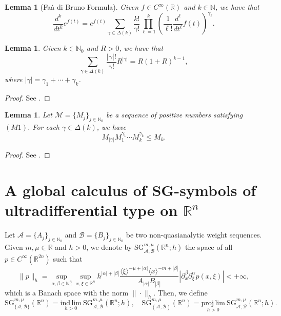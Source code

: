 \documentclass[11pt,reqno]{amsart}
\numberwithin{equation}{section}
\newtheorem{lemma}[theorem]{Lemma}
\newcommand{\R}{{\mathbb{R}}} %
\newcommand{\N}{{\mathbb{N}}} %
\newcommand{\SG}{{\mathrm{SG}}}
\newcommand{\Mj}{{\{M_j\}_{j\in\mathbb{N}_0}}} %
\newcommand{\Aj}{{\{A_j\}_{j\in\mathbb{N}_0}}} %
\newcommand{\Bj}{{\{B_j\}_{j\in\mathbb{N}_0}}} %
\newcommand{\M}{{\mathcal{M}}} %
\newcommand{\A}{{\mathcal{A}}} %
\newcommand{\B}{{\mathcal{B}}} %
\begin{document}
\begin{lemma}[Fa\`a di Bruno Formula]\label{faa}
	Given $f\in C^\infty(\mathbb{R})$ and $k\in\mathbb{N}$, we have that
	\begin{equation*}
		\dfrac{d^k}{dt^k}e^{f(t)}=
		e^{f(t)}\displaystyle\sum_{\gamma\in\Delta(k)}\dfrac{k!}{\gamma!}\prod_{\ell=1}^{k}\left(\dfrac{1}{\ell!}\dfrac{d^\ell}{dt^\ell}f(t)\right)^{\gamma_\ell}.
	\end{equation*}
\end{lemma}

\begin{lemma}\label{lemma_sum}
	Given $k\in\mathbb{N}_0$ and $R>0$, we have that
	\begin{equation*} 
		\sum_{\gamma\in\Delta(k)}\dfrac{|\gamma|!}{\gamma!}R^{|\gamma|}=R(1+R)^{k-1},
	\end{equation*}
	where $|\gamma|=\gamma_1+\cdots+\gamma_k$.
\end{lemma}
%
\begin{proof}
	See \cite[Lemma 1.4.1]{krantz}.
\end{proof}

\begin{lemma}\label{lemma_prod_M}
	Let $\M=\Mj$ be a sequence of positive numbers satisfying $(M1)$. For each $\gamma\in\Delta(k)$, we have
	\begin{equation*}M_{|\gamma|}M_1^{\gamma_1}\cdots M_k^{\gamma_k} \leq M_k.\end{equation*}
\end{lemma}
%
\begin{proof}
	See \cite[Proposition 4.4]{bier}.
\end{proof}



	
\section{A global calculus of SG-symbols of ultradifferential type on $\mathbb{R}^n$}\label{sec:SGABRn}

Let $\A=\Aj$ and $\B=\Bj$ be two non-quasianalytic weight sequences. Given $m,\mu\in\R$ and $h>0$, we denote by $\SG_{\A,\B}^{m,\mu}(\R^n;h)$ the space of all $p\in C^\infty(\R^{2n})$ such that
%
\[\|p\|_h = \sup_{\alpha,\beta\in\N_0^n}\sup_{x,\xi\in\R^n} h^{|\alpha|+|\beta|} \frac{\langle \xi \rangle^{-\mu+|\alpha|}\langle x\rangle^{-m+|\beta|}}{A_{|\alpha|} B_{|\beta|}}|\partial_x^\beta\partial_\xi^\alpha p(x,\xi)|<+\infty,\]
%
which is a Banach space with the norm $\|\cdot\|_h$. Then, we define
%
\[{\SG}_{\{\A,\B\}}^{m,\mu}(\R^n) = \underset{h>0}{\mathrm{ind\,lim}}\ {\SG}_{\A,\B}^{m,\mu}(\R^n;h),
\quad 
{\SG}_{(\A,\B)}^{m,\mu}(\R^n) = \underset{h>0}{\mathrm{proj\,lim}}\ {\SG}_{\A,\B}^{m,\mu}(\R^n;h).\]
\end{document}
